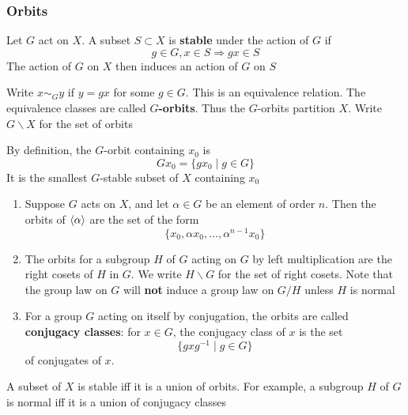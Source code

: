 \documentclass[11pt]{article}
\begin{document}
\subsubsection{Orbits}
\label{sec:org2f74e22}
Let \(G\) act on \(X\). A subset \(S\subset X\) is \textbf{stable} under the action of \(G\) if
\begin{equation*}
g\in G,x\in S\Rightarrow gx\in S
\end{equation*}
The action of \(G\) on \(X\) then induces an action of \(G\) on \(S\)

Write \(x\sim_Gy\) if \(y=gx\) for some \(g\in G\). This is an equivalence relation. The equivalence
classes are called \textbf{\(G\)-orbits}. Thus the \(G\)-orbits partition \(X\). Write \(G\backslash X\)
for the set of orbits

By definition, the \(G\)-orbit containing \(x_0\) is
\begin{equation*}
Gx_0=\{gx_0\mid g\in G\}
\end{equation*}
It is the smallest \(G\)-stable subset of \(X\) containing \(x_0\)

\begin{examplle}[]
\begin{enumerate}
\item Suppose \(G\) acts on \(X\), and let \(\alpha\in G\) be an element of order \(n\). Then the orbits
of \(\langle\alpha\rangle\) are the set of the form
\begin{equation*}
\{x_0,\alpha x_0,\dots,\alpha^{n-1}x_0\}
\end{equation*}
\item The orbits for a subgroup \(H\) of \(G\) acting on \(G\) by left multiplication are the right
cosets of \(H\) in \(G\). We write \(H\backslash G\) for the set of right cosets. Note that
the group law on \(G\) will \textbf{not} induce a group law on \(G/H\) unless \(H\) is normal
\item For a group \(G\) acting on itself by conjugation, the orbits are called \textbf{conjugacy classes}:
for \(x\in G\), the conjugacy class of \(x\) is the set
\begin{equation*}
\{gxg^{-1}\mid g\in G\}
\end{equation*}
of conjugates of \(x\).
\end{enumerate}
\end{examplle}

A subset of \(X\) is stable iff it is a union of orbits. For example, a subgroup \(H\) of \(G\)
is normal iff it is a union of conjugacy classes
\end{document}
